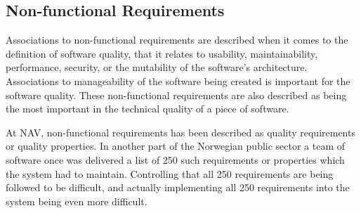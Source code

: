 

\subsection{Non-functional Requirements}
Associations to non-functional requirements are described when it comes to the definition of software quality, that it relates to usability, maintainability, performance, security, or the mutability of the software's architecture. Associations to manageability of the software being created is important for the software quality. These non-functional requirements are also described as being the most important in the technical quality of a piece of software.

At NAV, non-functional requirements has been described as quality requirements or quality properties. In another part of the Norwegian public sector a team of software once was delivered a list of 250 such requirements or properties which the system had to maintain. Controlling that all 250 requirements are being followed to be difficult, and actually implementing all 250 requirements into the system being even more difficult.


